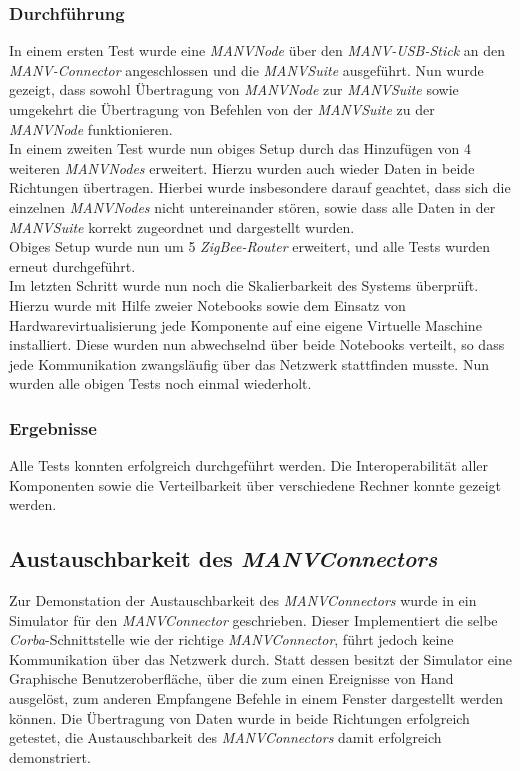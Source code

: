 \subsubsection{Durchführung}
In einem ersten Test wurde eine \emph{MANVNode} über den \emph{MANV-USB-Stick} an den \emph{MANV-Connector}
angeschlossen und die \emph{MANVSuite} ausgeführt. Nun wurde gezeigt, dass sowohl Übertragung von \emph{MANVNode}
zur \emph{MANVSuite} sowie umgekehrt die Übertragung von Befehlen von der \emph{MANVSuite} zu der \emph{MANVNode}
funktionieren.\\
In einem zweiten Test wurde nun obiges Setup durch das Hinzufügen von 4 weiteren \emph{MANVNodes} erweitert. Hierzu
wurden auch wieder Daten in beide Richtungen übertragen. Hierbei wurde insbesondere darauf geachtet, dass sich die
einzelnen \emph{MANVNodes} nicht untereinander stören, sowie dass alle Daten in der \emph{MANVSuite} korrekt zugeordnet
und dargestellt wurden.\\
Obiges Setup wurde nun um 5 \emph{ZigBee-Router} erweitert, und alle Tests wurden erneut durchgeführt.\\
Im letzten Schritt wurde nun noch die Skalierbarkeit des Systems überprüft. Hierzu wurde mit Hilfe zweier Notebooks
sowie dem Einsatz von Hardwarevirtualisierung jede Komponente auf eine eigene Virtuelle Maschine installiert. Diese
wurden nun abwechselnd über beide Notebooks verteilt, so dass jede Kommunikation zwangsläufig über das Netzwerk
stattfinden musste. Nun wurden alle obigen Tests noch einmal wiederholt.

\subsubsection{Ergebnisse}
Alle Tests konnten erfolgreich durchgeführt werden. Die Interoperabilität aller Komponenten sowie die Verteilbarkeit
über verschiedene Rechner konnte gezeigt werden.

\subsection{Austauschbarkeit des \emph{MANVConnectors}}
Zur Demonstation der Austauschbarkeit des \emph{MANVConnectors} wurde in \cite{Jan} ein Simulator für den 
\emph{MANVConnector} geschrieben. Dieser Implementiert die selbe \emph{Corba}-Schnittstelle wie der richtige
\emph{MANVConnector}, führt jedoch keine Kommunikation über das Netzwerk durch. Statt dessen besitzt
der Simulator eine Graphische Benutzeroberfläche, über die zum einen Ereignisse von Hand ausgelöst, zum
anderen Empfangene Befehle in einem Fenster dargestellt werden können. Die Übertragung von Daten wurde
in beide Richtungen erfolgreich getestet, die Austauschbarkeit des \emph{MANVConnectors} damit
erfolgreich demonstriert.

